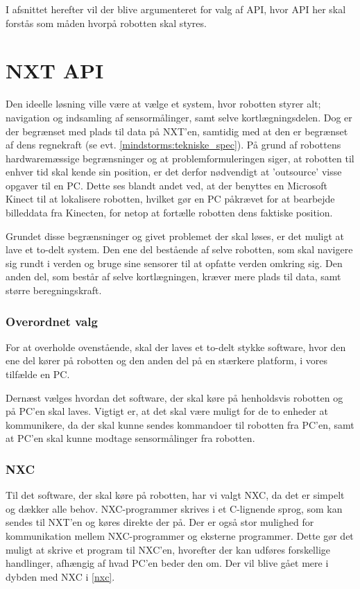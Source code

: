I afsnittet herefter vil der blive argumenteret for valg af API, hvor API her skal forstås som måden hvorpå robotten skal styres.

\section{NXT API}\label{nxt_api}
Den ideelle løsning ville være at vælge et system, hvor robotten styrer alt; navigation og indsamling af sensormålinger, samt selve kortlægningsdelen.
Dog er der begrænset med plads til data på NXT'en, samtidig med at den er begrænset af dens regnekraft (se evt. \cref{mindstorms:tekniske_spec}).
På grund af robottens hardwaremæssige begrænsninger og at problemformuleringen siger, at robotten til enhver tid skal kende sin position, er det derfor nødvendigt at 'outsource' visse opgaver til en PC.
Dette ses blandt andet ved, at der benyttes en Microsoft Kinect til at lokalisere robotten, hvilket gør en PC påkrævet for at bearbejde billeddata fra Kinecten, for netop at fortælle robotten dens faktiske position.

Grundet disse begrænsninger og givet problemet der skal løses, er det muligt at lave et to-delt system.
Den ene del bestående af selve robotten, som skal navigere sig rundt i verden og bruge sine sensorer til at opfatte verden omkring sig.
Den anden del, som består af selve kortlægningen, kræver mere plads til data, samt større beregningskraft.

\subsubsection*{Overordnet valg}
For at overholde ovenstående, skal der laves et to-delt stykke software, hvor den ene del kører på robotten og den anden del på en stærkere platform, i vores tilfælde en PC.

Dernæst vælges hvordan det software, der skal køre på henholdsvis robotten og på PC'en skal laves.
Vigtigt er, at det skal være muligt for de to enheder at kommunikere, da der skal kunne sendes kommandoer til robotten fra PC'en, samt at PC'en skal kunne modtage sensormålinger fra robotten.

\subsubsection*{NXC}
Til det software, der skal køre på robotten, har vi valgt NXC, da det er simpelt og dækker alle behov.
NXC-programmer skrives i et C-lignende sprog, som kan sendes til NXT'en og køres direkte der på.
Der er også stor mulighed for kommunikation mellem NXC-programmer og eksterne programmer.
Dette gør det muligt at skrive et program til NXC'en, hvorefter der kan udføres forskellige handlinger, afhængig af hvad PC'en beder den om.
Der vil blive gået mere i dybden med NXC i \cref{nxc}.


